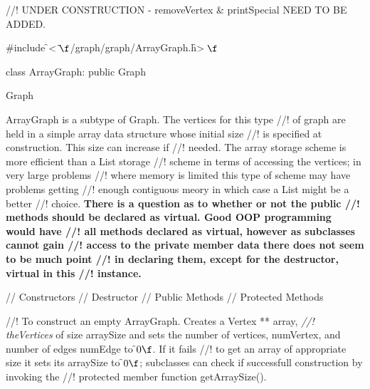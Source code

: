 
//! UNDER CONSTRUCTION - removeVertex \& printSpecial NEED TO BE ADDED.

\indent \#include \f$<\tilde{ }\f$/graph/graph/ArrayGraph.h\f$>\f$

\indent class ArrayGraph: public Graph

\indent Graph
\indent{}

\indent ArrayGraph is a subtype of Graph. The vertices for this type
//! of graph are held in a simple array data structure whose initial size
//! is specified at construction. This size can increase if
//! needed. The array storage scheme is more efficient than a List storage
//! scheme in terms of accessing the vertices; in very large problems
//! where memory is limited this type of scheme may have problems getting
//! enough contiguous meory in which case a List might be a better
//! choice. {\bf There is a question as to whether or not the public
//! methods should be declared as virtual. Good OOP programming would have
//! all methods declared as virtual, however as subclasses cannot gain
//! access to the private member data there does not seem to be much point
//! in declaring them, except for the destructor, virtual in this
//! instance.} 


\indent\indent // Constructors
\indent{}
\indent\indent // Destructor
\indent{}
\indent\indent // Public Methods
\indent{}
\indent{}
\indent{}
\indent{}
\indent{}
\indent{}
\indent{}
\indent\indent // Protected Methods
\indent{}


//! To construct an empty ArrayGraph. Creates a Vertex ** array, {\em
//! theVertices} of size \p arraySize and sets the number of vertices,
\p numVertex, and number of edges \p numEdge to \f$0\f$. If it fails
//! to get an array of appropriate size it sets its \p arraySize to
\f$0\f$; subclasses can check if successfull construction by invoking the
//! protected member function getArraySize().

